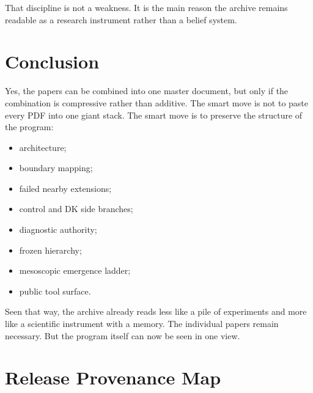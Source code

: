 \documentclass[11pt]{article}
\begin{document}
That discipline is not a weakness. It is the main reason the archive remains readable as a research instrument rather than a belief system.

\section{Conclusion}

Yes, the papers can be combined into one master document, but only if the combination is compressive rather than additive. The smart move is not to paste every PDF into one giant stack. The smart move is to preserve the structure of the program:
\begin{itemize}
\item architecture;
\item boundary mapping;
\item failed nearby extensions;
\item control and DK side branches;
\item diagnostic authority;
\item frozen hierarchy;
\item mesoscopic emergence ladder;
\item public tool surface.
\end{itemize}

Seen that way, the archive already reads less like a pile of experiments and more like a scientific instrument with a memory. The individual papers remain necessary. But the program itself can now be seen in one view.

\appendix

\section{Release Provenance Map}
\end{document}
